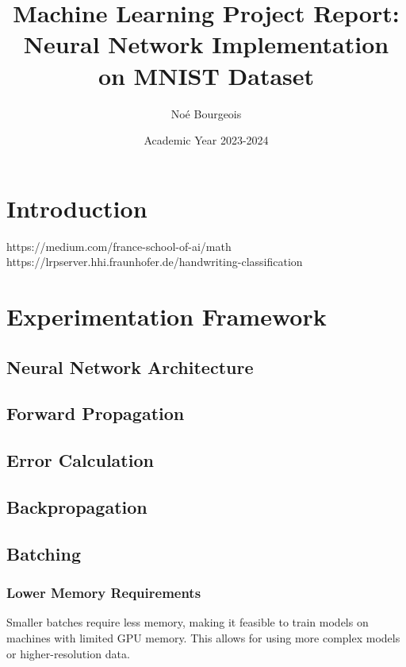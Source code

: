 \documentclass[utf8,1pt]{extarticle} %
\title{Machine Learning Project Report: Neural Network Implementation on MNIST Dataset}
\author{Noé Bourgeois}
\date{Academic Year 2023-2024}
\begin{document}
\maketitle

\begin{abstract}
\end{abstract}

\section{Introduction}
https://medium.com/france-school-of-ai/math%
https://lrpserver.hhi.fraunhofer.de/handwriting-classification
\section{Experimentation Framework}

\subsection{Neural Network Architecture}

\subsection{Forward Propagation}

\subsection{Error Calculation}

\subsection{Backpropagation}

\subsection{Batching}
\subsubsection{Lower Memory Requirements}
 Smaller batches require less memory, making it feasible to train models on machines with limited GPU memory. 
 This allows for using more complex models or higher-resolution data.
\end{document}
